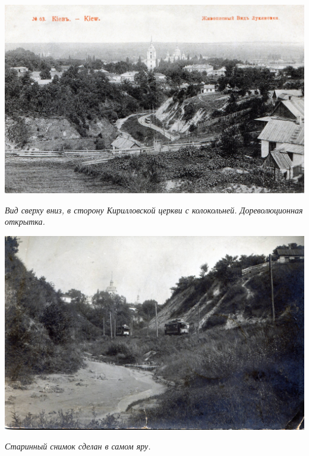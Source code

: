 \vspace*{\fill}


\begin{center}
\includegraphics[width=\linewidth]{chast-zmiy/kurilo/s-r02.jpg}

\textit{Вид сверху вниз, в сторону Кирилловской церкви с колокольней. Дореволюционная открытка.}
\end{center}

\vspace*{\fill}

\begin{center}
\includegraphics[width=\linewidth]{chast-zmiy/kurilo/s-r05.jpg}

\textit{Старинный снимок сделан в самом яру.}
\end{center}

\vspace*{\fill}



